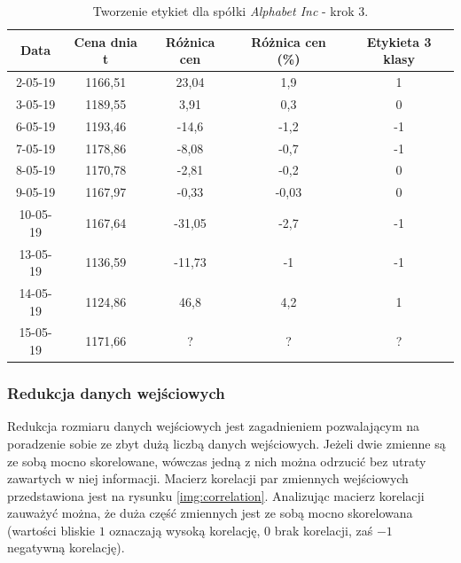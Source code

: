 \documentclass[a4paper, twoside, 11pt, openright]{article}
\begin{document}
 \begin{table}[H]
    \centering
    \begin{tabular}{|c|c|c|c|c|}
    \hline
        \textbf{Data}  & \textbf{Cena dnia t} & \textbf{Różnica cen} & \textbf{Różnica cen (\%)}  & \textbf{Etykieta 3 klasy} \\ \hline
            2-05-19 & 1166,51 & 23,04 & 1,9 & 1 \\ \hline
            3-05-19 & 1189,55 & 3,91 & 0,3 & 0 \\ \hline
            6-05-19 & 1193,46 &  -14,6 & -1,2 & -1 \\ \hline
            7-05-19 & 1178,86 &  -8,08 & -0,7 & -1 \\ \hline
            8-05-19 & 1170,78 & -2,81 & -0,2 & 0 \\ \hline
            9-05-19 & 1167,97 &  -0,33 & -0,03 & 0 \\ \hline
            10-05-19 & 1167,64 &  -31,05 & -2,7 & -1 \\ \hline
            13-05-19 & 1136,59 &  -11,73 & -1 & -1 \\ \hline
            14-05-19 & 1124,86 &  46,8 & 4,2 & 1 \\ \hline 
            15-05-19 & 1171,66 & ? & ? & ? \\ \hline
    \end{tabular}
    \caption{Tworzenie etykiet dla spółki \textit{Alphabet Inc} - krok 3.}
    \label{tab:classification_label_creation}
\end{table} 

\subsubsection{Redukcja danych wejściowych}

Redukcja rozmiaru danych wejściowych jest zagadnieniem pozwalającym na poradzenie sobie ze zbyt dużą liczbą danych wejściowych. Jeżeli dwie zmienne są ze sobą mocno skorelowane, wówczas jedną z nich można odrzucić bez utraty zawartych w niej informacji. Macierz korelacji par zmiennych wejściowych przedstawiona jest na rysunku \ref{img:correlation}. Analizując macierz korelacji zauważyć można, że duża część zmiennych jest ze sobą mocno skorelowana (wartości bliskie $1$ oznaczają wysoką korelację, 0 brak korelacji, zaś $-1$ negatywną korelację).
\end{document}
